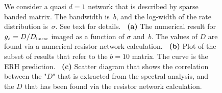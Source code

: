 \documentclass[aps,prb,floats,floatfix,twocolumn]{revtex4}
\newcommand{\tbox}[1]{\mbox{\tiny #1}}
\begin{document}
\begin{widetext}
\begin{figure}[H]
\caption{
We consider a quasi $d{=}1$ network that is described 
by sparse banded matrix. The bandwidth is~$b$, 
and the log-width of the rate distribution is~$\sigma$.  
See text for details.
%
{\bf \ (a)} The numerical result for $g_s=D/D_{\tbox{linear}}$ 
imaged as a function of $\sigma$ and~$b$.
The values of $D$ are found via a numerical 
resistor network calculation.  
%
{\bf \ (b)} Plot of the subset of results that 
refer to the $b=10$ matrix. 
The curve is the ERH prediction. 
%
{\bf \ (c)} Scatter diagram that shows 
the correlation between the "$D$" that is extracted 
from the spectral analysis, and the $D$ that  
has been found via the resistor network calculation.}
\label{f4}
\end{figure}



\end{widetext}

\end{document}
